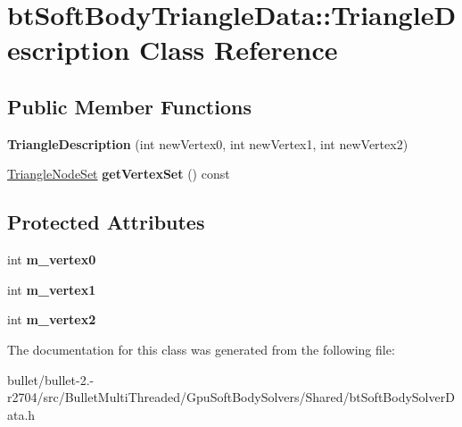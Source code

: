 \hypertarget{classbt_soft_body_triangle_data_1_1_triangle_description}{\section{bt\+Soft\+Body\+Triangle\+Data\+:\+:Triangle\+Description Class Reference}
\label{classbt_soft_body_triangle_data_1_1_triangle_description}
}
\subsection*{Public Member Functions}
\begin{DoxyCompactItemize}
\item 
\hypertarget{classbt_soft_body_triangle_data_1_1_triangle_description_a9badc65b91d151ab2286c75742a95a6b}{{\bfseries Triangle\+Description} (int new\+Vertex0, int new\+Vertex1, int new\+Vertex2)}\label{classbt_soft_body_triangle_data_1_1_triangle_description_a9badc65b91d151ab2286c75742a95a6b}

\item 
\hypertarget{classbt_soft_body_triangle_data_1_1_triangle_description_a85671dff695767b5a07e9330e50521c5}{\hyperlink{classbt_soft_body_triangle_data_1_1_triangle_node_set}{Triangle\+Node\+Set} {\bfseries get\+Vertex\+Set} () const }\label{classbt_soft_body_triangle_data_1_1_triangle_description_a85671dff695767b5a07e9330e50521c5}

\end{DoxyCompactItemize}
\subsection*{Protected Attributes}
\begin{DoxyCompactItemize}
\item 
\hypertarget{classbt_soft_body_triangle_data_1_1_triangle_description_a9898bfc20610b47b5a8a12b4a3475344}{int {\bfseries m\+\_\+vertex0}}\label{classbt_soft_body_triangle_data_1_1_triangle_description_a9898bfc20610b47b5a8a12b4a3475344}

\item 
\hypertarget{classbt_soft_body_triangle_data_1_1_triangle_description_a67bbe48a955df79913763ab6c400e0f3}{int {\bfseries m\+\_\+vertex1}}\label{classbt_soft_body_triangle_data_1_1_triangle_description_a67bbe48a955df79913763ab6c400e0f3}

\item 
\hypertarget{classbt_soft_body_triangle_data_1_1_triangle_description_a97abfb5481fcdfdca71044fee127a58b}{int {\bfseries m\+\_\+vertex2}}\label{classbt_soft_body_triangle_data_1_1_triangle_description_a97abfb5481fcdfdca71044fee127a58b}

\end{DoxyCompactItemize}


The documentation for this class was generated from the following file\+:\begin{DoxyCompactItemize}
\item 
bullet/bullet-\/2.-\/r2704/src/\+Bullet\+Multi\+Threaded/\+Gpu\+Soft\+Body\+Solvers/\+Shared/bt\+Soft\+Body\+Solver\+Data.\+h\end{DoxyCompactItemize}
